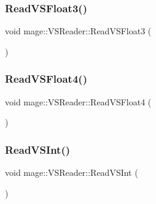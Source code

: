 \hypertarget{classmage_1_1_v_s_reader_a63d8c0cb3108d8aa0f582a59b44db6ac}{}\label{classmage_1_1_v_s_reader_a63d8c0cb3108d8aa0f582a59b44db6ac} 
\subsubsection{\texorpdfstring{Read\+V\+S\+Float3()}{ReadVSFloat3()}}
{\footnotesize\ttfamily void mage\+::\+V\+S\+Reader\+::\+Read\+V\+S\+Float3 (\begin{DoxyParamCaption}{ }\end{DoxyParamCaption})\hspace{0.3cm}{\ttfamily [private]}}

\hypertarget{classmage_1_1_v_s_reader_aa1230cf0d6305f98172aabeacbfef8e0}{}\label{classmage_1_1_v_s_reader_aa1230cf0d6305f98172aabeacbfef8e0} 
\subsubsection{\texorpdfstring{Read\+V\+S\+Float4()}{ReadVSFloat4()}}
{\footnotesize\ttfamily void mage\+::\+V\+S\+Reader\+::\+Read\+V\+S\+Float4 (\begin{DoxyParamCaption}{ }\end{DoxyParamCaption})\hspace{0.3cm}{\ttfamily [private]}}

\hypertarget{classmage_1_1_v_s_reader_abbb6176a73ebddd88fc3ed58c89aa01a}{}\label{classmage_1_1_v_s_reader_abbb6176a73ebddd88fc3ed58c89aa01a} 
\subsubsection{\texorpdfstring{Read\+V\+S\+Int()}{ReadVSInt()}}
{\footnotesize\ttfamily void mage\+::\+V\+S\+Reader\+::\+Read\+V\+S\+Int (\begin{DoxyParamCaption}{ }\end{DoxyParamCaption})\hspace{0.3cm}{\ttfamily [private]}}

